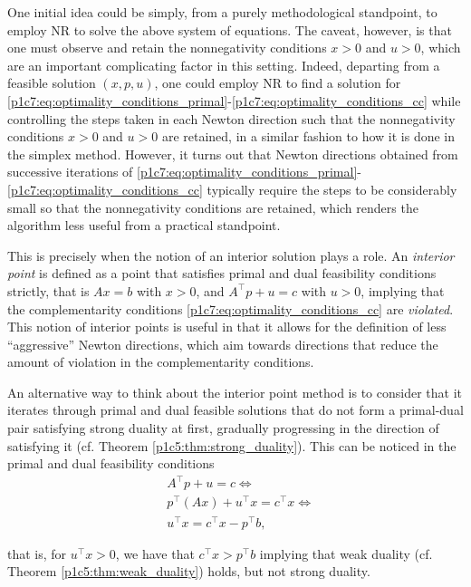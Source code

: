 One initial idea could be simply, from a purely methodological standpoint, to employ NR to solve the above system of equations. The caveat, however, is that one must observe and retain the nonnegativity conditions $x > 0$ and $u >0$, which are an important complicating factor in this setting. Indeed, departing from a feasible solution $(x,p,u)$, one could employ NR to find a solution for \eqref{p1c7:eq:optimality_conditions_primal}-\eqref{p1c7:eq:optimality_conditions_cc} while controlling the steps taken in each Newton direction such that the nonnegativity conditions $x > 0$ and $u >0$ are retained, in a similar fashion to how it is done in the simplex method. However, it turns out that Newton directions obtained from successive iterations of \eqref{p1c7:eq:optimality_conditions_primal}- \eqref{p1c7:eq:optimality_conditions_cc} typically require the steps to be considerably small so that the nonnegativity conditions are retained, which renders the algorithm less useful from a practical standpoint.
	   
This is precisely when the notion of an interior solution plays a role. An \emph{interior point} is defined as a point that satisfies primal and dual feasibility conditions strictly, that is $Ax = b$ with $x > 0$, and $A^\top p + u = c$ with $u >0$, implying that the complementarity conditions \eqref{p1c7:eq:optimality_conditions_cc} are \emph{violated}. This notion of interior points is useful in that it allows for the definition of less ``aggressive'' Newton directions, which aim towards directions that reduce the amount of violation in the complementarity conditions. 

An alternative way to think about the interior point method is to consider that it iterates through primal and dual feasible solutions that do not form a primal-dual pair satisfying strong duality at first, gradually progressing in the direction of satisfying it (cf. Theorem \ref{p1c5:thm:strong_duality}). This can be noticed in the primal and dual feasibility conditions  
%
\begin{align}
	& A^\top p + u = c \Leftrightarrow \nonumber\\	
	& p^\top (A x) + u^\top x = c^\top x  \Leftrightarrow  \nonumber\\
	& u^\top x = c^\top x - p^\top b, \label{p1c7:primal_dual_gap}
\end{align}

that is, for $u^\top x > 0$, we have that $c^\top x > p^\top b$ implying that weak duality (cf. Theorem \ref{p1c5:thm:weak_duality}) holds, but not strong duality. 

